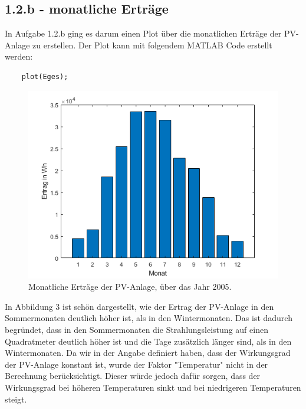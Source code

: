 \documentclass[a4paper,12pt]{article}
\begin{document}
	\subsection{1.2.b - monatliche Erträge}
	In Aufgabe 1.2.b ging es darum einen Plot über die monatlichen Erträge der PV-Anlage zu erstellen.\newline
	Der Plot kann mit folgendem MATLAB Code erstellt werden:
	\begin{lstlisting}
	plot(Eges);
	\end{lstlisting}
	\begin{figure}[H]
		\centering
		\includegraphics[width=12cm]{img/results/MonatlicheErtraege}
		\caption{Monatliche Erträge der PV-Anlage, über das Jahr 2005.}
	\end{figure}
	In Abbildung 3 ist schön dargestellt, wie der Ertrag der PV-Anlage in den Sommermonaten deutlich höher ist, als in den Wintermonaten.\newline
	Das ist dadurch begründet, dass in den Sommermonaten die Strahlungsleistung auf einen Quadratmeter deutlich höher ist und die Tage zusätzlich länger sind, als in den Wintermonaten.\newline
	Da wir in der Angabe definiert haben, dass der Wirkungsgrad der PV-Anlage konstant ist, wurde der Faktor "Temperatur" nicht in der Berechnung berücksichtigt.\newline
	Dieser würde jedoch dafür sorgen, dass der Wirkungsgrad bei höheren Temperaturen sinkt und bei niedrigeren Temperaturen steigt.
\end{document}
